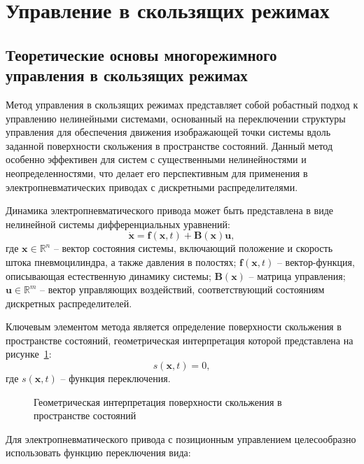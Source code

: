 \section{Управление в скользящих режимах}\label{sec:ch3/sec3}

\subsection{Теоретические основы многорежимного управления в скользящих режимах}\label{subsec:ch3/sec3/sub1}

Метод управления в скользящих режимах представляет собой робастный подход к управлению нелинейными системами,
основанный на переключении структуры управления для обеспечения движения изображающей точки системы вдоль заданной поверхности скольжения в
пространстве состояний. Данный метод особенно эффективен для систем с существенными нелинейностями и неопределенностями, что делает его
перспективным для применения в электропневматических приводах с дискретными распределителями.

Динамика электропневматического привода может быть представлена в виде нелинейной системы дифференциальных уравнений:
\begin{equation}
	\dot{\mathbf{x}} = \mathbf{f}(\mathbf{x}, t) + \mathbf{B}(\mathbf{x})\mathbf{u},
\end{equation}
где $\mathbf{x} \in \mathbb{R}^n$ -- вектор состояния системы, включающий положение и скорость штока пневмоцилиндра, а также давления в полостях;
$\mathbf{f}(\mathbf{x}, t)$ -- вектор-функция, описывающая естественную динамику системы;
$\mathbf{B}(\mathbf{x})$ -- матрица управления; $\mathbf{u} \in \mathbb{R}^m$ -- вектор управляющих воздействий, соответствующий состояниям дискретных распределителей.

Ключевым элементом метода является определение поверхности скольжения в пространстве состояний, геометрическая интерпретация которой представлена на рисунке~\ref{fig:phase_plane}:
\begin{equation}
	s(\mathbf{x}, t) = 0,
\end{equation}
где $s(\mathbf{x}, t)$ -- функция переключения.

\begin{figure}[ht]
	\caption{Геометрическая интерпретация поверхности скольжения в пространстве состояний}
	\label{fig:phase_plane}
\end{figure}

Для электропневматического привода с позиционным управлением целесообразно использовать функцию переключения вида:

